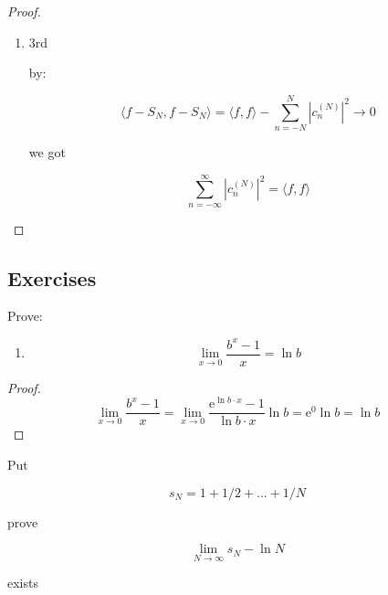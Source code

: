 \begin{proof}
\begin{enumerate}
    \item 3rd

    by:

    \[
        \langle f - S_N , f - S_N \rangle = \langle f,f \rangle - \sum_{n=-N}^{N}\left|c_n^{(N)} \right|^2  \to 0
    \]

    we got

    \[
\sum_{n=-\infty}^{\infty}\left|c_n^{(N)} \right|^2 = \langle f, f \rangle
    \]
\end{enumerate}


\end{proof}


\subsection{Exercises}

\begin{exercise}
Prove:

\begin{enumerate}
    \item \[ \lim_{x \to 0} \frac{b^x - 1}{x} = \ln b\]
\end{enumerate}

\begin{proof}
    \item \[ 
        \lim_{x \to 0} \frac{b^x - 1}{x} = \lim_{x \to 0} \frac{\mathrm{e}^{\ln b \cdot x} - 1}{ \ln b \cdot x} \ln b = \mathrm{e}^0 \ln b = \ln b
    \]
\end{proof}
\end{exercise}


\begin{exercise}
    Put

    \[
        s_N = 1 + 1/2 + ... + 1/N
    \]

    prove

    \[
        \lim_{N \to \infty} s_N - \ln N
    \]

    exists

\end{exercise}

